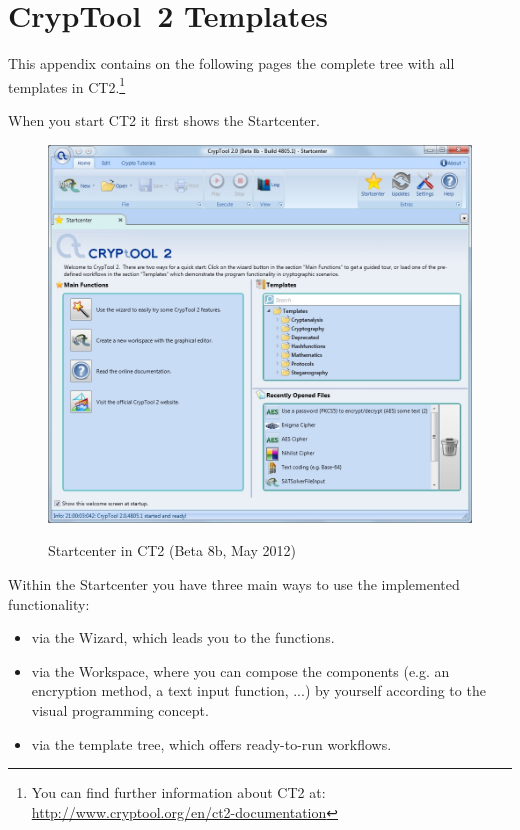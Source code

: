 \newpage
\hypertarget{appendix-template-overview-CT2}{}
\section{CrypTool~2 Templates}
\label{s:appendix-template-overview-CT2}

\noindent This appendix contains on the following pages the complete tree with
all templates in CT2.\footnote{%
  You can find further information about CT2 at:
  \url{http://www.cryptool.org/en/ct2-documentation}
}

\noindent When you start CT2 it first shows the Startcenter.

\begin{figure}[hb]
\begin{center}
\includegraphics[scale=0.45, angle=0] {figures/CT2-Startcenter-en}
\hypertarget{Welcome-CT2}{}
\caption{Startcenter in CT2 (Beta 8b, May 2012)} 
\label{Welcome-Screenshot-CT2}
\end{center}
\end{figure}

\noindent Within the Startcenter you have three main ways to use the implemented functionality:
\begin{itemize}
   \item via the Wizard, which leads you to the functions.
   \item via the Workspace, where you can compose the components (e.g. an encryption method, a text input function, ...)  by yourself according to the visual programming concept.
   \item via the template tree, which offers ready-to-run workflows.
 \end{itemize}


